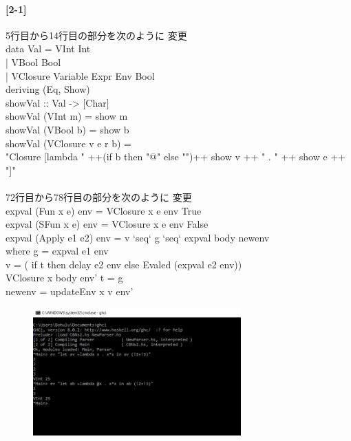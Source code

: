 \documentclass[20 pts]{article}
\begin{document}
    \paragraph{[2-1]}
     5行目から14行目の部分を次のように 変更\\
     
     data Val = VInt Int\\
         | VBool Bool\\
         | VClosure Variable Expr Env Bool\\
         deriving (Eq, Show)\\

showVal :: Val -> [Char]\\
showVal (VInt m) = show m\\
showVal (VBool b) = show b\\
showVal (VClosure v e r b) =\\
  "Closure [lambda " ++(if b then "@" else "")++ show v ++ " . " ++ show e ++ "]"
  \paragraph{}
        72行目から78行目の部分を次のように 変更\\
        expval (Fun x e) env = VClosure x e env True\\

expval (SFun x e) env = VClosure x e env False\\

expval (Apply e1 e2) env =
  v `seq` g `seq` expval body newenv\\
  where g = expval e1 env\\
        v = ( if t then delay e2 env  else Evaled (expval e2 env))\\
        VClosure x body env' t = g\\
        newenv = updateEnv x v env'\\
        
        \begin {center}
\begin{figure}[h!]
\includegraphics[width=8cm]{2_1.jpg}
\label{SystemModel}
\end{figure}
\end{center}
       
\end{document}
